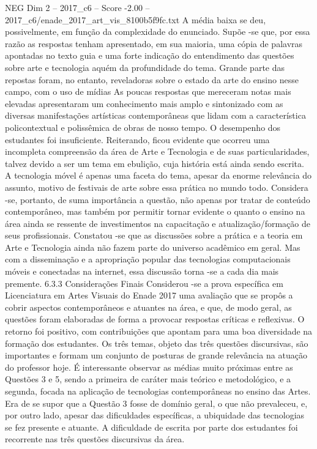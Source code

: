 \begin{textsample}{NEG Dim 2 – 2017\_c6 – Score -2.00 – 2017\_c6/enade\_2017\_art\_vis\_8100b5f9fc.txt}
A média baixa se deu, possivelmente, em função da complexidade do enunciado.
Supõe -se que, por essa razão as respostas tenham apresentado, em sua maioria, uma cópia de palavras apontadas no texto guia e uma forte indicação do entendimento das questões sobre arte e tecnologia aquém da profundidade do tema.
Grande parte das repostas foram, no entanto, reveladoras sobre o estado da arte do ensino nesse campo, com o uso de mídias As poucas respostas que mereceram notas mais elevadas apresentaram um conhecimento mais amplo e sintonizado com as diversas manifestações artísticas contemporâneas que lidam com a característica policontextual e polissêmica de obras de nosso tempo.
O desempenho dos estudantes foi insuficiente.
Reiterando, ficou evidente que ocorreu uma incompleta compreensão da área de Arte e Tecnologia e de suas particularidades, talvez devido a ser um tema em ebulição, cuja história está ainda sendo escrita.
A tecnologia móvel é apenas uma faceta do tema, apesar da enorme relevância do assunto, motivo de festivais de arte sobre essa prática no mundo todo.
Considera -se, portanto, de suma importância a questão, não apenas por tratar de conteúdo contemporâneo, mas também por permitir tornar evidente o quanto o ensino na área ainda se ressente de investimentos na capacitação e atualização/formação de seus profissionais.
Constatou -se que as discussões sobre a prática e a teoria em Arte e Tecnologia ainda não fazem parte do universo acadêmico em geral.
Mas com a disseminação e a apropriação popular das tecnologias computacionais móveis e conectadas na internet, essa discussão torna -se a cada dia mais premente. 6.3.3 Considerações Finais Considerou -se a prova específica em Licenciatura em Artes Visuais do Enade 2017 uma avaliação que se propôs a cobrir aspectos contemporâneos e atuantes na área, e que, de modo geral, as questões foram elaboradas de forma a provocar respostas críticas e reflexivas.
O retorno foi positivo, com contribuições que apontam para uma boa diversidade na formação dos estudantes.
Os três temas, objeto das três questões discursivas, são importantes e formam um conjunto de posturas de grande relevância na atuação do professor hoje.
É interessante observar as médias muito próximas entre as Questões 3 e 5, sendo a primeira de caráter mais teórico e metodológico, e a segunda, focada na aplicação de tecnologias contemporâneas no ensino das Artes.
Era de se supor que a Questão 3 fosse de domínio geral, o que não prevaleceu, e, por outro lado, apesar das dificuldades específicas, a ubiquidade das tecnologias se fez presente e atuante.
A dificuldade de escrita por parte dos estudantes foi recorrente nas três questões discursivas da área.

\end{textsample}
